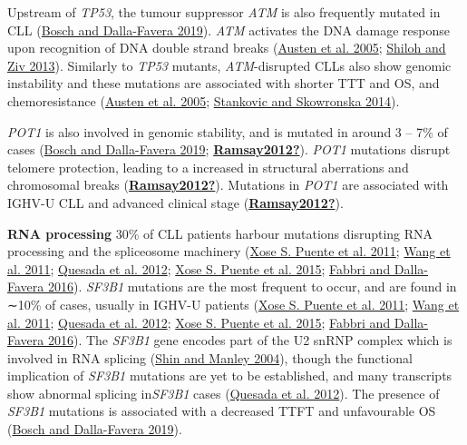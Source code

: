 \documentclass[11pt, a4paper, twosided]{book}
\begin{document}
Upstream of \emph{TP53}, the tumour suppressor \emph{ATM} is also frequently mutated in CLL (\protect\hyperlink{ref-Bosch2019}{Bosch and Dalla-Favera 2019}). \emph{ATM} activates the DNA damage response upon recognition of DNA double strand breaks (\protect\hyperlink{ref-Austen2005}{Austen et al. 2005}; \protect\hyperlink{ref-Shiloh2013}{Shiloh and Ziv 2013}). Similarly to \emph{TP53} mutants, \emph{ATM}-disrupted CLLs also show genomic instability and these mutations are associated with shorter TTT and OS, and chemoresistance (\protect\hyperlink{ref-Austen2005}{Austen et al. 2005}; \protect\hyperlink{ref-Stankovic2014}{Stankovic and Skowronska 2014}).

\emph{POT1} is also involved in genomic stability, and is mutated in around 3 -- 7\% of cases (\protect\hyperlink{ref-Bosch2019}{Bosch and Dalla-Favera 2019}; \protect\hyperlink{ref-Ramsay2012}{\textbf{Ramsay2012?}}). \emph{POT1} mutations disrupt telomere protection, leading to a increased in structural aberrations and chromosomal breaks (\protect\hyperlink{ref-Ramsay2012}{\textbf{Ramsay2012?}}). Mutations in \emph{POT1} are associated with IGHV-U CLL and advanced clinical stage (\protect\hyperlink{ref-Ramsay2012}{\textbf{Ramsay2012?}}).

\textbf{RNA processing}
30\% of CLL patients harbour mutations disrupting RNA processing and the spliceosome machinery (\protect\hyperlink{ref-Puente2011}{Xose S. Puente et al. 2011}; \protect\hyperlink{ref-Wang2011}{Wang et al. 2011}; \protect\hyperlink{ref-Quesada2012}{Quesada et al. 2012}; \protect\hyperlink{ref-Puente2015}{Xose S. Puente et al. 2015}; \protect\hyperlink{ref-Fabbri2016}{Fabbri and Dalla-Favera 2016}).
\emph{SF3B1} mutations are the most frequent to occur, and are found in ∼10\% of cases, usually in IGHV-U patients (\protect\hyperlink{ref-Puente2011}{Xose S. Puente et al. 2011}; \protect\hyperlink{ref-Wang2011}{Wang et al. 2011}; \protect\hyperlink{ref-Quesada2012}{Quesada et al. 2012}; \protect\hyperlink{ref-Puente2015}{Xose S. Puente et al. 2015}; \protect\hyperlink{ref-Fabbri2016}{Fabbri and Dalla-Favera 2016}). The \emph{SF3B1} gene encodes part of the U2 snRNP complex which is involved in RNA splicing (\protect\hyperlink{ref-Shin2004}{Shin and Manley 2004}), though the functional implication of \emph{SF3B1} mutations are yet to be established, and many transcripts show abnormal splicing in\emph{SF3B1} cases (\protect\hyperlink{ref-Quesada2012}{Quesada et al. 2012}). The presence of \emph{SF3B1} mutations is associated with a decreased TTFT and unfavourable OS (\protect\hyperlink{ref-Bosch2019}{Bosch and Dalla-Favera 2019}).
\end{document}
